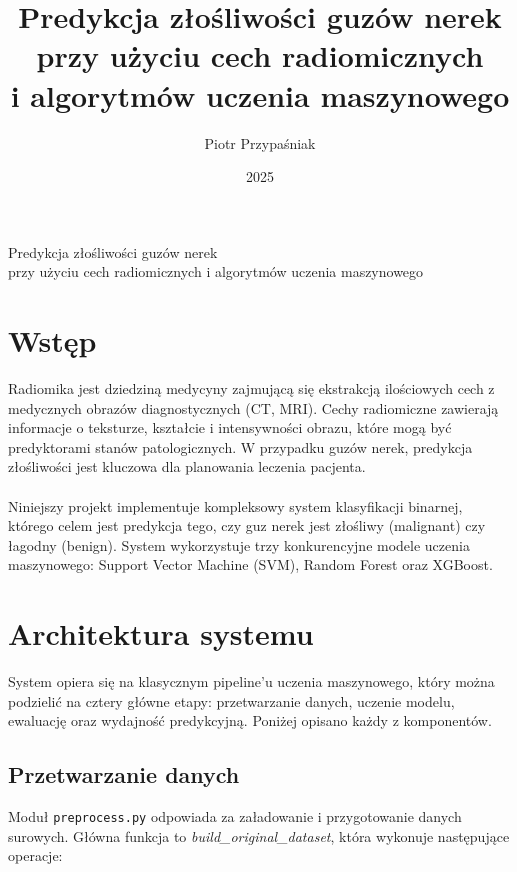 \documentclass[12pt]{article}
\title{Predykcja złośliwości guzów nerek\\przy użyciu cech radiomicznych\\i algorytmów uczenia maszynowego}
\author{Piotr Przypaśniak}
\date{2025}
\begin{document}
\begin{framed}
\begin{center}
    {\Large Predykcja złośliwości guzów nerek\\
    przy użyciu cech radiomicznych i algorytmów uczenia maszynowego}
\end{center}
\end{framed}

\maketitle

\section{Wstęp}

Radiomika jest dziedziną medycyny zajmującą się ekstrakcją ilościowych cech z medycznych obrazów diagnostycznych (CT, MRI). Cechy radiomiczne zawierają informacje o teksturze, kształcie i intensywności obrazu, które mogą być predyktorami stanów patologicznych. W przypadku guzów nerek, predykcja złośliwości jest kluczowa dla planowania leczenia pacjenta.\\\\

Niniejszy projekt implementuje kompleksowy system klasyfikacji binarnej, którego celem jest predykcja tego, czy guz nerek jest złośliwy (malignant) czy łagodny (benign). System wykorzystuje trzy konkurencyjne modele uczenia maszynowego: Support Vector Machine (SVM), Random Forest oraz XGBoost.

\section{Architektura systemu}

System opiera się na klasycznym pipeline'u uczenia maszynowego, który można podzielić na cztery główne etapy: przetwarzanie danych, uczenie modelu, ewaluację oraz wydajność predykcyjną. Poniżej opisano każdy z komponentów.

\subsection{Przetwarzanie danych}

Moduł \texttt{preprocess.py} odpowiada za załadowanie i przygotowanie danych surowych. Główna funkcja to \textit{build\_original\_dataset}, która wykonuje następujące operacje:
\end{document}
